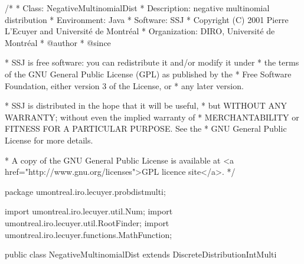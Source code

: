 \begin{code}
\begin{hide}
/*
 * Class:        NegativeMultinomialDist
 * Description:  negative multinomial distribution 
 * Environment:  Java
 * Software:     SSJ 
 * Copyright (C) 2001  Pierre L'Ecuyer and Université de Montréal
 * Organization: DIRO, Université de Montréal
 * @author       
 * @since

 * SSJ is free software: you can redistribute it and/or modify it under
 * the terms of the GNU General Public License (GPL) as published by the
 * Free Software Foundation, either version 3 of the License, or
 * any later version.

 * SSJ is distributed in the hope that it will be useful,
 * but WITHOUT ANY WARRANTY; without even the implied warranty of
 * MERCHANTABILITY or FITNESS FOR A PARTICULAR PURPOSE.  See the
 * GNU General Public License for more details.

 * A copy of the GNU General Public License is available at
   <a href="http://www.gnu.org/licenses">GPL licence site</a>.
 */
\end{hide}
package umontreal.iro.lecuyer.probdistmulti;
\begin{hide}
import umontreal.iro.lecuyer.util.Num;
import umontreal.iro.lecuyer.util.RootFinder;
import umontreal.iro.lecuyer.functions.MathFunction;
\end{hide}


public class NegativeMultinomialDist extends DiscreteDistributionIntMulti \begin{hide} {
   protected double n;
   protected double p[];

   private static class Function implements MathFunction {
      protected double Fl[];
      protected int ups[];
      protected int k;
      protected int M;
      protected int sumUps;

      public Function (int k, int m, int ups[], double Fl[]) {
         this.k = k;
         this.M = m;

         this.Fl = new double[Fl.length];
         System.arraycopy (Fl, 0, this.Fl, 0, Fl.length);
         this.ups = new int[ups.length];
         System.arraycopy (ups, 0, this.ups, 0, ups.length);

         sumUps = 0;
         for (int i = 0; i < ups.length; i++)
            sumUps += ups[i];
      }

      public double evaluate (double gamma) {
         double sum = 0.0;
         for (int l = 0; l < M; l++)
            sum += (Fl[l] / (gamma + (double) l));
         return (sum - Math.log1p (sumUps / (k * gamma)));
      }
   }

\end{hide}
\end{code}
